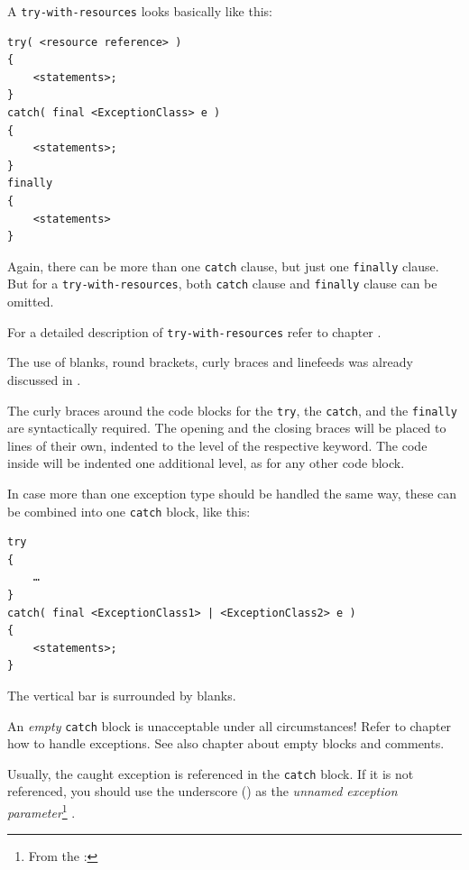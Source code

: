 A \verb#try-with-resources# looks basically like this:
\begin{lstlisting}
try( <resource reference> )
{
    <statements>;
}
catch( final <ExceptionClass> e )
{
    <statements>;
}
finally
{
    <statements>
}
\end{lstlisting}
Again, there can be more than one \lstinline|catch| clause, but just one \lstinline|finally| clause. But for a \verb#try-with-resources#, both \lstinline|catch| clause and \lstinline|finally| clause can be omitted.

For a detailed description of \verb#try-with-resources# refer to chapter .

The use of blanks, round brackets, curly braces and linefeeds was already discussed in .

The curly braces around the code blocks for the \lstinline|try|, the \lstinline|catch|, and the \lstinline|finally| are syntactically required. The opening and the closing braces will be placed to lines of their own, indented to the level of the respective keyword. The code inside will be indented one additional level, as for any other code block.

In case more than one exception type should be handled the same way, these can be combined into one \lstinline|catch| block, like this:
\begin{lstlisting}
try
{
    …
}
catch( final <ExceptionClass1> | <ExceptionClass2> e )
{
    <statements>;
}
\end{lstlisting}
The vertical bar is surrounded by blanks.

An \textit{empty} \lstinline|catch| block is unacceptable under all circumstances! Refer to chapter  how to handle exceptions. See also chapter  about empty blocks and comments.

Usually, the caught exception is referenced in the \lstinline|catch| block. If it is not referenced, you should use the underscore (\bdq{\lstinline|_|}) as the \textit{unnamed exception parameter}\footnote{From the \jls: } \autocite{ORACLE_DOC_LANGUAGE_SPECIFICATION:Declarations}. 

